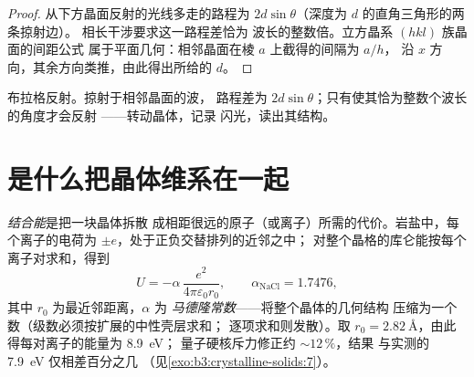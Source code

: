 \begin{proof}
从下方晶面反射的光线多走的路程为 $2d
\sin\theta$（深度为 $d$ 的直角三角形的两条掠射边）。
相长干涉要求这一路程差恰为
波长的整数倍。立方晶系 $(hkl)$ 族晶面的间距公式
属于平面几何：相邻晶面在棱 $a$ 上截得的间隔为 $a/h$，
沿 $x$ 方向，其余方向类推，由此得出所给的 $d$。
\end{proof}

\begin{omfigure}

{\small 布拉格反射。掠射于相邻晶面的波，
路程差为 $2d\sin\theta$；只有使其恰为整数个波长的角度才会反射
——转动晶体，记录
闪光，读出其结构。}
\end{omfigure}

\section{是什么把晶体维系在一起}

\begin{proposition}\label{prop:b3:crystalline-solids:madelung}
\emph{结合能}是把一块晶体拆散
成相距很远的原子（或离子）所需的代价。岩盐中，每个离子的电荷为
$\pm e$，处于正负交替排列的近邻之中；
对整个晶格的库仑能按每个离子对求和，得到
\[
U = -\alpha\,\frac{e^2}{4\pi\varepsilon_0 r_0} ,
\qquad \alpha_{\text{NaCl}} = 1.7476 ,
\]
其中 $r_0$ 为最近邻距离，$\alpha$ 为
\emph{马德隆常数}——将整个晶体的几何结构
压缩为一个数（级数必须按扩展的中性壳层求和；
逐项求和则发散）。取 $r_0 =
\qty{2.82}{\angstrom}$，由此得每对离子的能量为 \qty{8.9}{eV}；
量子硬核斥力修正约 $\sim12\,\%$，结果
与实测的 \qty{7.9}{eV} 仅相差百分之几
（见\cref{exo:b3:crystalline-solids:7}）。
\end{proposition}
\admitted

